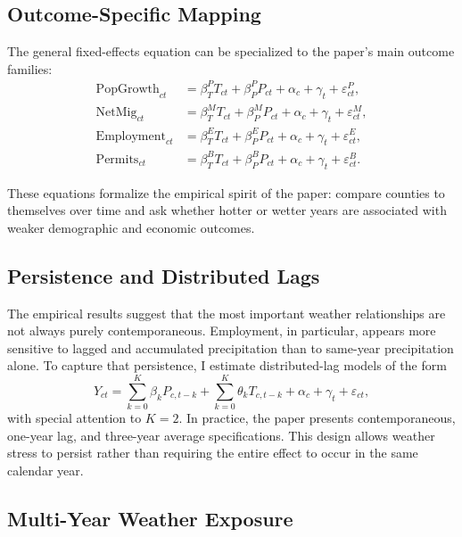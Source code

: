 \documentclass[12pt]{article}
\begin{document}
\subsection{Outcome-Specific Mapping}

The general fixed-effects equation can be specialized to the paper's main outcome families:
\begin{align}
\text{PopGrowth}_{ct} &= \beta_T^P T_{ct} + \beta_P^P P_{ct} + \alpha_c + \gamma_t + \varepsilon_{ct}^P, \\
\text{NetMig}_{ct} &= \beta_T^M T_{ct} + \beta_P^M P_{ct} + \alpha_c + \gamma_t + \varepsilon_{ct}^M, \\
\text{Employment}_{ct} &= \beta_T^E T_{ct} + \beta_P^E P_{ct} + \alpha_c + \gamma_t + \varepsilon_{ct}^E, \\
\text{Permits}_{ct} &= \beta_T^B T_{ct} + \beta_P^B P_{ct} + \alpha_c + \gamma_t + \varepsilon_{ct}^B.
\end{align}

These equations formalize the empirical spirit of the paper: compare counties to themselves over time and ask whether hotter or wetter years are associated with weaker demographic and economic outcomes.

\subsection{Persistence and Distributed Lags}

The empirical results suggest that the most important weather relationships are not always purely contemporaneous. Employment, in particular, appears more sensitive to lagged and accumulated precipitation than to same-year precipitation alone. To capture that persistence, I estimate distributed-lag models of the form
\begin{equation}
Y_{ct} = \sum_{k=0}^{K}\beta_k P_{c,t-k} + \sum_{k=0}^{K}\theta_k T_{c,t-k} + \alpha_c + \gamma_t + \varepsilon_{ct},
\end{equation}
with special attention to $K=2$. In practice, the paper presents contemporaneous, one-year lag, and three-year average specifications. This design allows weather stress to persist rather than requiring the entire effect to occur in the same calendar year.

\subsection{Multi-Year Weather Exposure}
\end{document}
